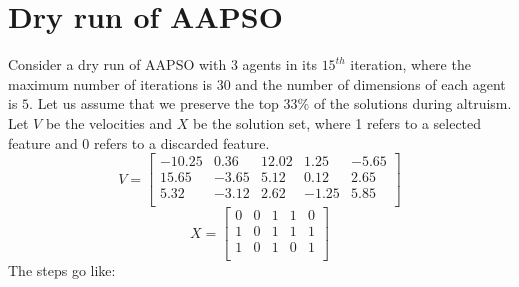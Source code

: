 \documentclass[final,3p,times]{elsarticle}
\begin{document}
\appendix
\section{Dry run of AAPSO}
\label{ap:PSO}
Consider a dry run of AAPSO with $3$ agents in its $15^{th}$ iteration, where the maximum number of iterations is $30$ and the number of dimensions of each agent is $5$. Let us assume that we preserve the top $33\%$ of the solutions during altruism. Let $V$ be the velocities and $X$ be the solution set, where 1 refers to a selected feature and 0 refers to a discarded feature.
\[
V=
  \begin{bmatrix}
    -10.25 & 0.36 & 12.02 & 1.25 & -5.65 \\
    15.65 & -3.65 & 5.12 & 0.12 & 2.65 \\
    5.32 & -3.12 & 2.62 & -1.25 & 5.85\\
  \end{bmatrix}\]
\[
X= \begin{bmatrix}
  0 & 0 & 1 & 1 & 0\\
  1 & 0 & 1 & 1 & 1\\
  1 & 0 & 1 & 0 & 1\\
\end{bmatrix}
\]
The steps go like:
\end{document}

